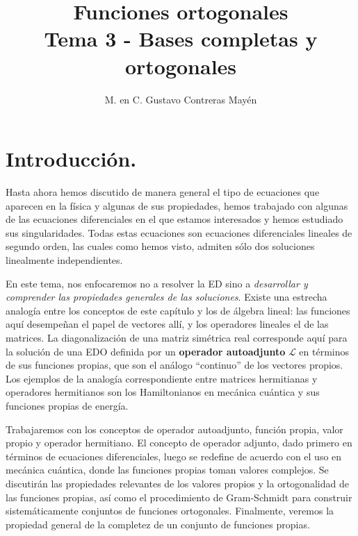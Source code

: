 
\usepackage{apacite}
\title{Funciones ortogonales \\[0.3em]  \large{Tema 3 - Bases completas y ortogonales}\vspace{-3ex}}
\author{M. en C. Gustavo Contreras Mayén}
\date{ }

\vspace{-4cm}
\maketitle
\fontsize{14}{14}\selectfont
\tableofcontents
\newpage
\section{Introducción.}

Hasta ahora hemos discutido de manera general el tipo de ecuaciones que aparecen en la física y algunas de sus propiedades, hemos trabajado con algunas de las ecuaciones diferenciales en el que estamos interesados y hemos estudiado sus singularidades. Todas estas ecuaciones son ecuaciones diferenciales lineales de segundo orden, las cuales como hemos visto, admiten sólo dos soluciones linealmente independientes.
\par
En este tema, nos enfocaremos no a resolver la ED sino a \emph{desarrollar y comprender las propiedades generales de las soluciones}. Existe una estrecha analogía entre los conceptos de este capítulo y los de álgebra lineal: las funciones aquí desempeñan el papel de vectores allí, y los operadores lineales el de las matrices. La diagonalización de una matriz simétrica real corresponde aquí para la solución de una EDO definida por un \textbf{operador autoadjunto} $\mathcal{L}$ en términos de sus funciones propias, que son el análogo \enquote{continuo} de los vectores propios. Los ejemplos de la analogía correspondiente entre matrices hermitianas y operadores hermitianos son los Hamiltonianos en mecánica cuántica y sus funciones propias de energía.
\par
Trabajaremos con los conceptos de operador autoadjunto, función propia, valor propio y operador hermitiano. El concepto de operador adjunto, dado primero en términos de ecuaciones diferenciales, luego se redefine de acuerdo con el uso en mecánica cuántica, donde las funciones propias toman valores complejos. Se discutirán las propiedades relevantes de los valores propios y la ortogonalidad de las funciones propias, así como el procedimiento de Gram-Schmidt para construir sistemáticamente conjuntos de funciones ortogonales. Finalmente, veremos la propiedad general de la completez de un conjunto de funciones propias.

